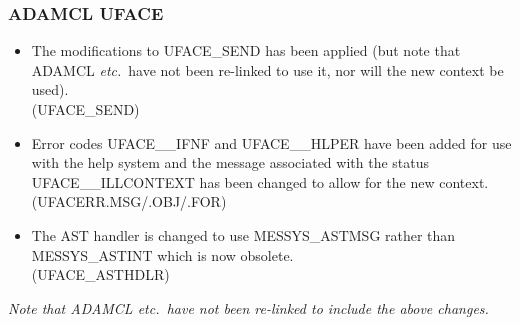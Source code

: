 \subsubsection{ADAMCL UFACE}
\begin{itemize}
\item The modifications to UFACE\_SEND has been applied (but note that ADAMCL
{\em etc.}\ have not been re-linked to use it, nor will the new context be
used).\\
(UFACE\_SEND)
\item Error codes UFACE\_\_IFNF and UFACE\_\_HLPER have been added for use 
with the help system and
the message associated with the status UFACE\_\_ILLCONTEXT has been 
changed to allow for the new context.\\
(UFACERR.MSG/.OBJ/.FOR)
\item The AST handler is changed to use MESSYS\_ASTMSG rather than
MESSYS\_ASTINT which is now obsolete.\\
(UFACE\_ASTHDLR)
\end{itemize}
{\em Note that ADAMCL etc.\ have not been re-linked to include the above 
changes.}

